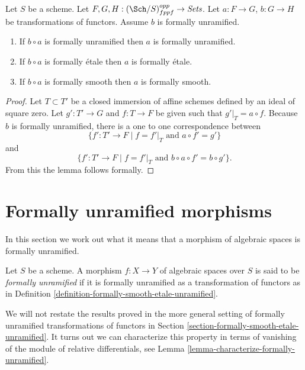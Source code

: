 \begin{lemma}
\label{lemma-formally-permanence}
Let $S$ be a scheme.
Let $F, G, H : (\Sch/S)_{fppf}^{opp} \to \textit{Sets}$.
Let $a : F \to G$, $b : G \to H$ be transformations of functors.
Assume $b$ is formally unramified.
\begin{enumerate}
\item If $b \circ a$ is formally unramified then $a$ is formally unramified.
\item If $b \circ a$ is formally \'etale then $a$ is formally \'etale.
\item If $b \circ a$ is formally smooth then $a$ is formally smooth.
\end{enumerate}
\end{lemma}

\begin{proof}
Let $T \subset T'$ be a closed immersion of affine schemes defined by an ideal
of square zero. Let $g' : T' \to G$ and $f : T \to F$ be given such that
$g'|_T = a \circ f$. Because $b$ is formally unramified, there is a one
to one correspondence between
$$
\{f' : T' \to F \mid f = f'|_T\text{ and }a \circ f' = g'\}
$$
and
$$
\{f' : T' \to F \mid f = f'|_T\text{ and }b \circ a \circ f' = b \circ g'\}.
$$
From this the lemma follows formally.
\end{proof}








\section{Formally unramified morphisms}
\label{section-formally-unramified}

\noindent
In this section we work out what it means that a morphism of algebraic spaces
is formally unramified.

\begin{definition}
\label{definition-formally-unramified}
Let $S$ be a scheme. A morphism $f : X \to Y$ of algebraic spaces over $S$
is said to be {\it formally unramified} if it is formally unramified as a
transformation of functors as in
Definition \ref{definition-formally-smooth-etale-unramified}.
\end{definition}

\noindent
We will not restate the results proved in the more general setting of
formally unramified transformations of functors in
Section \ref{section-formally-smooth-etale-unramified}.
It turns out we can characterize this property in terms of vanishing of the
module of relative differentials, see
Lemma \ref{lemma-characterize-formally-unramified}.


